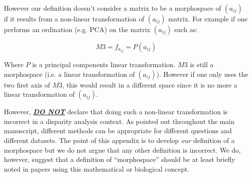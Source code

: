 \documentclass[12pt,letterpaper]{article}
\begin{document}
However our definition doesn't consider a matrix to be a morphospace of $(a_{ij})$ if it results from a non-linear transformation of $(a_{ij})$ matrix.
For example if one performs an ordination (e.g. PCA) on the matrix $(a_{ij})$ such as:

\begin{equation}
    M3 = f_{a_{ij}} = P(a_{ij})
\end{equation}

\noindent Where $P$ is a principal components linear transformation.
$M3$ is still a morphospace (i.e. a linear transformation of $(a_{ij})$). However if one only uses the two first axis of $M3$, this would result in a different space since it is no more a linear transformation of $(a_{ij})$.

However, \textbf{\underline{\textit{DO NOT}}} declare that doing such a non-linear transformation is incorrect in a disparity analysis context.
As pointed out throughout the main manuscript, different methods can be appropriate for different questions and different datasets.
The point of this appendix is to develop \textit{our} definition of a morphospace but we do not argue that any other definition is incorrect.
We do, however, suggest that a definition of ``morphospace'' should be at least briefly noted in papers using this mathematical or biological concept.




\end{document}

